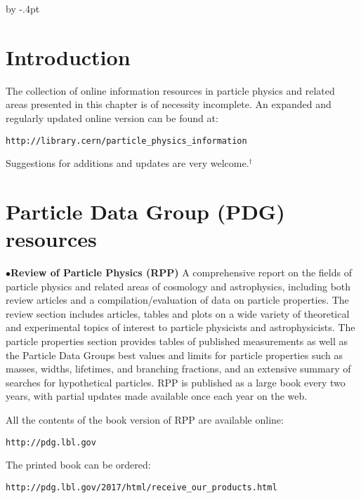 %
\itemindent=10pt

\advance\baselineskip by -.4pt


\parindent=0pt
\def\url#1{\tt#1\rm}
\section{Introduction}%

The collection of online information resources in particle physics and related areas 
presented in this chapter is of necessity incomplete. An expanded and regularly updated 
online version can be found at: 

		\item{} \url{http://library.cern/particle\_physics\_information}

Suggestions for additions and updates are very welcome.$^\dagger$ 

\vglue -0.1in
\section{Particle Data Group (PDG) resources}%

\item{$\bullet$}{\bf Review of Particle Physics (RPP)}
A comprehensive report on the fields of particle physics and related areas of cosmology and astrophysics, including both review articles and a compilation/evaluation of data on particle properties. The review section includes articles, tables and plots on a wide variety of theoretical and experimental topics of interest to particle physicists and astrophysicists. The particle properties section provides tables of published measurements as well as the Particle Data Groups best values and limits for particle properties such as masses, widths, lifetimes, and branching fractions, and an extensive summary of searches for hypothetical particles. RPP is published as a large book every two years, with partial updates made available once each year on the web.

\item{} All the contents of the book version of RPP are available online:

         \item{}\quad\url{http://pdg.lbl.gov}

\item{} The printed book can be ordered:

         \item{}\quad\url{http://pdg.lbl.gov/2017/html/receive\_our\_products.html}

